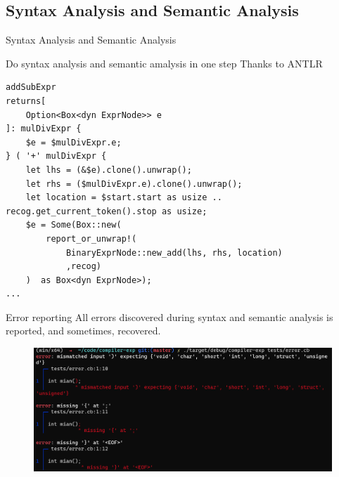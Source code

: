 \documentclass[aspectratio=1610]{ctexbeamer}
\begin{document}
\subsection{Syntax Analysis and Semantic Analysis}
\begin{frame}[fragile]{Syntax Analysis and Semantic Analysis}
    \begin{outline}
        \1 Do syntax analysis and semantic amalysis in one step
            \2 Thanks to ANTLR
    \end{outline}
\begin{verbatim}
addSubExpr
returns[
    Option<Box<dyn ExprNode>> e
]: mulDivExpr {
    $e = $mulDivExpr.e;
} ( '+' mulDivExpr {
    let lhs = (&$e).clone().unwrap();
    let rhs = ($mulDivExpr.e).clone().unwrap();
    let location = $start.start as usize .. recog.get_current_token().stop as usize;
    $e = Some(Box::new(
        report_or_unwrap!(
            BinaryExprNode::new_add(lhs, rhs, location)
            ,recog)
    )  as Box<dyn ExprNode>);
...
\end{verbatim}
\end{frame}
\begin{frame}{Error reporting}
    All errors discovered during syntax and semantic analysis is reported, and sometimes, recovered.
    \begin{figure}[htp]
      \centering
      \includegraphics[width=\linewidth]{image1.png}
      \caption{}
    \end{figure}
\end{frame}
\end{document}
